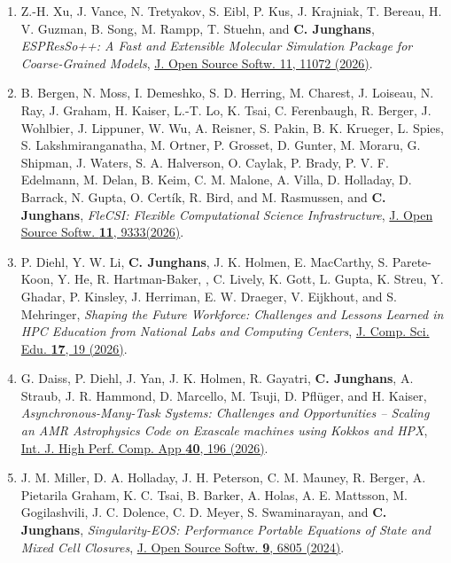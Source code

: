 \documentclass{article}
\begin{document}
\begin{enumerate}

\item[51.] Z.-H. Xu, J. Vance, N. Tretyakov, S. Eibl, P. Kus, J. Krajniak, T. Bereau, H. V. Guzman, B. Song, M. Rampp, T. Stuehn, and \textbf{C. Junghans},
   \textit{ESPResSo++: A Fast and Extensible Molecular Simulation Package for Coarse-Grained Models},
   \href{https://doi.org/10.21105/joss.11072}{J. Open Source Softw. 11, 11072 (2026)}.

\item[50.] B. Bergen, N. Moss, I. Demeshko, S. D. Herring, M. Charest, J. Loiseau, N. Ray, J. Graham, H. Kaiser, L.-T. Lo, K. Tsai, C. Ferenbaugh, R. Berger, J. Wohlbier, J. Lippuner, W. Wu, A. Reisner, S. Pakin, B. K. Krueger, L. Spies, S. Lakshmiranganatha, M. Ortner, P. Grosset, D. Gunter, M. Moraru, G. Shipman, J. Waters, S. A. Halverson, O. Caylak, P. Brady, P. V. F. Edelmann, M. Delan, B. Keim, C. M. Malone, A. Villa, D. Holladay, D. Barrack, N. Gupta, O. Certík, R. Bird, and M. Rasmussen, and \textbf{C. Junghans},
   \textit{FleCSI: Flexible Computational Science Infrastructure},
   \href{https://doi.org/10.21105/joss.09333}{J. Open Source Softw. \textbf{11}, 9333(2026)}.

\item[49.]  P. Diehl, Y. W. Li, \textbf{C. Junghans}, J. K. Holmen, E. MacCarthy, S. Parete-Koon, Y. He, R. Hartman-Baker, , C. Lively, K. Gott, L. Gupta, K. Streu, Y. Ghadar, P. Kinsley, J. Herriman, E. W. Draeger, V. Eijkhout, and S. Mehringer,
   \textit{Shaping the Future Workforce: Challenges and Lessons Learned in HPC Education from National Labs and Computing Centers},
   \href{https://doi.org/10.22369/issn.2153-4136/17/1/3}{J. Comp. Sci. Edu. \textbf{17}, 19 (2026)}.

\item[48.] G. Daiss, P. Diehl, J. Yan, J. K. Holmen, R. Gayatri, \textbf{C. Junghans}, A. Straub, J. R. Hammond, D. Marcello, M. Tsuji, D. Pflüger, and H. Kaiser,
   \textit{Asynchronous-Many-Task Systems: Challenges and Opportunities -- Scaling an AMR Astrophysics Code on Exascale machines using Kokkos and HPX},
   \href{https://doi.org/10.1177/10943420251386503}{Int. J. High Perf. Comp. App \textbf{40}, 196 (2026)}.

\item[47.] J. M. Miller, D. A. Holladay, J. H. Peterson, C. M. Mauney, R. Berger, A. Pietarila Graham, K. C. Tsai, B. Barker, A. Holas, A. E. Mattsson, M. Gogilashvili, J. C. Dolence, C. D. Meyer, S. Swaminarayan, and \textbf{C. Junghans},
    \textit{Singularity-EOS: Performance Portable Equations of State and Mixed Cell Closures},
    \href{https://doi.org/10.21105/joss.06805}{J. Open Source Softw. \textbf{9}, 6805 (2024)}.


\end{enumerate}
\end{document}
